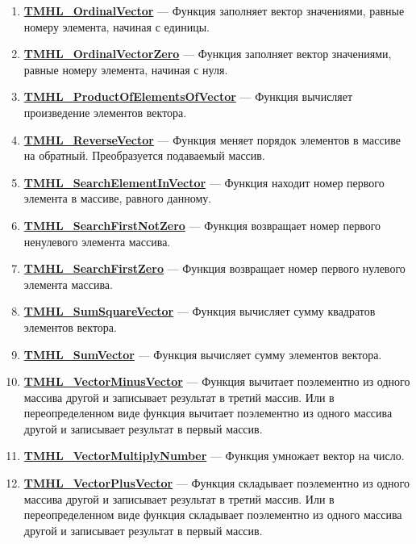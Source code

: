 \documentclass[a4paper,12pt]{article}
\begin{document}
\begin{enumerate}
\item \textbf{\hyperref[TMHL_OrdinalVector]{TMHL\_OrdinalVector}} --- Функция заполняет вектор значениями, равные номеру элемента, начиная с единицы.

\item \textbf{\hyperref[TMHL_OrdinalVectorZero]{TMHL\_OrdinalVectorZero}} --- Функция заполняет вектор значениями, равные номеру элемента, начиная с нуля.

\item \textbf{\hyperref[TMHL_ProductOfElementsOfVector]{TMHL\_ProductOfElementsOfVector}} --- Функция вычисляет произведение элементов вектора.

\item \textbf{\hyperref[TMHL_ReverseVector]{TMHL\_ReverseVector}} --- Функция меняет порядок элементов в массиве на обратный. Преобразуется подаваемый массив.

\item \textbf{\hyperref[TMHL_SearchElementInVector]{TMHL\_SearchElementInVector}} --- Функция находит номер первого элемента в массиве, равного данному.

\item \textbf{\hyperref[TMHL_SearchFirstNotZero]{TMHL\_SearchFirstNotZero}} --- Функция возвращает номер первого ненулевого элемента массива.

\item \textbf{\hyperref[TMHL_SearchFirstZero]{TMHL\_SearchFirstZero}} --- Функция возвращает номер первого нулевого элемента массива.

\item \textbf{\hyperref[TMHL_SumSquareVector]{TMHL\_SumSquareVector}} --- Функция вычисляет сумму квадратов элементов вектора.

\item \textbf{\hyperref[TMHL_SumVector]{TMHL\_SumVector}} --- Функция вычисляет сумму элементов вектора.

\item \textbf{\hyperref[TMHL_VectorMinusVector]{TMHL\_VectorMinusVector}} --- Функция вычитает поэлементно из одного массива другой и записывает результат в третий массив. Или в переопределенном виде функция вычитает поэлементно из одного массива другой и записывает результат в первый массив.

\item \textbf{\hyperref[TMHL_VectorMultiplyNumber]{TMHL\_VectorMultiplyNumber}} --- Функция умножает вектор на число.

\item \textbf{\hyperref[TMHL_VectorPlusVector]{TMHL\_VectorPlusVector}} --- Функция складывает поэлементно из одного массива другой и записывает результат в третий массив. Или в переопределенном виде функция складывает поэлементно из одного массива другой и записывает результат в первый массив.


\end{enumerate}
\end{document}
